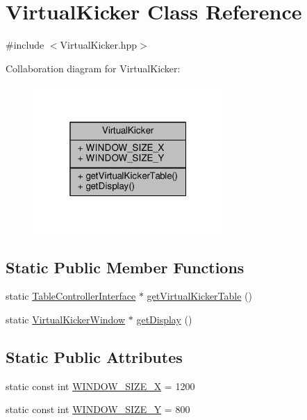 \hypertarget{class_virtual_kicker}{}\section{Virtual\+Kicker Class Reference}
\label{class_virtual_kicker}


{\ttfamily \#include $<$Virtual\+Kicker.\+hpp$>$}



Collaboration diagram for Virtual\+Kicker\+:\nopagebreak
\begin{figure}[H]
\begin{center}
\leavevmode
\includegraphics[width=205pt]{class_virtual_kicker__coll__graph}
\end{center}
\end{figure}
\subsection*{Static Public Member Functions}
\begin{DoxyCompactItemize}
\item 
static \hyperlink{class_table_controller_interface}{Table\+Controller\+Interface} $\ast$ \hyperlink{class_virtual_kicker_ad59e6a68db914c8580f44e00d5015d76}{get\+Virtual\+Kicker\+Table} ()
\item 
static \hyperlink{class_virtual_kicker_window}{Virtual\+Kicker\+Window} $\ast$ \hyperlink{class_virtual_kicker_a564d975ad0b9eeabc5c9ce4cbf381061}{get\+Display} ()
\end{DoxyCompactItemize}
\subsection*{Static Public Attributes}
\begin{DoxyCompactItemize}
\item 
static const int \hyperlink{class_virtual_kicker_ab00ead9976b5ea4269238403772a0205}{W\+I\+N\+D\+O\+W\+\_\+\+S\+I\+Z\+E\+\_\+X} = 1200
\item 
static const int \hyperlink{class_virtual_kicker_a3fb0d845e01a7424ac7a37f4299875ad}{W\+I\+N\+D\+O\+W\+\_\+\+S\+I\+Z\+E\+\_\+Y} = 800
\end{DoxyCompactItemize}



